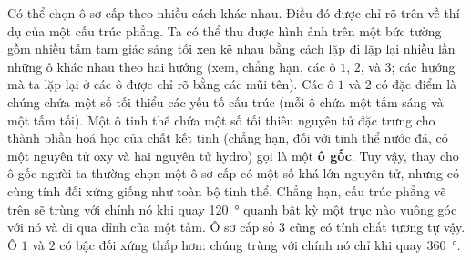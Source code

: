 
Có thể chọn ô sơ cấp theo nhiều cách khác nhau. Điều đó được chỉ rõ trên  về thí dụ của một cấu trúc phẳng. Ta có thể thu được hình ảnh trên một bức tường gồm nhiều tấm tam giác sáng tối xen kẽ nhau bằng cách lặp đi lặp lại nhiều lần những ô khác nhau theo hai hướng (xem, chẳng hạn, các ô $1$, $2$, và $3$; các hướng mà ta lặp lại ở các ô được chỉ rõ bằng các mũi tên). Các ô $1$ và $2$ có đặc điểm là chúng chứa một số tối thiểu các yếu tố cấu trúc (mỗi ô chứa một tấm sáng và một tấm tối). Một ô tinh thể chứa một số tối thiêu nguyên tử đặc trưng cho thành phần hoá học của chất kết tinh (chẳng hạn, đối với tinh thể nước đá, có một nguyên tử oxy và hai nguyên tử hydro) gọi là một \textbf{ô gốc}. Tuy vậy, thay cho ô gốc người ta thường chọn một ô sơ cấp có một số khá lớn nguyên tử, nhưng có cùng tính đối xứng giống như toàn bộ tinh thể. Chẳng hạn, cấu trúc phẳng vẽ trên  sẽ trùng với chính nó khi quay \SI{120}{\degree} quanh bất kỳ một trục nào vuông góc với nó và đi qua đỉnh của một tấm. Ô sơ cấp số $3$ cũng có tính chất tương tự vậy. Ô $1$ và $2$ có bậc đối xứng thấp hơn: chúng trùng với chính nó chỉ khi quay \SI{360}{\degree}.


